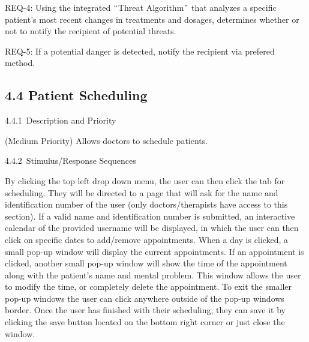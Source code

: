 \documentclass[12pt]{article}
\renewcommand{\_}{\kern-1.5pt\textunderscore\kern-1.5pt}
\begin{document}
\begin{adjustwidth}{0.5in}{0.0in}
REQ-4: Using the integrated $``$Threat Algorithm$"$  that analyzes a specific patient’s most recent changes in treatments and dosages, determines whether or not to notify the recipient of potential threats.\par

\end{adjustwidth}

\begin{adjustwidth}{0.5in}{0.0in}
REQ-5: If a potential danger is detected, notify the recipient via prefered method.\par

\end{adjustwidth}

\setlength{\parskip}{3.96pt}
\subsection*{4.4 \hspace*{10pt}Patient Scheduling}
\setlength{\parskip}{12.0pt}
4.4.1\  \tab Description and Priority\par

(Medium Priority) Allows doctors to schedule patients.\par

4.4.2\  \tab Stimulus/Response Sequences\par

By clicking the top left drop down menu, the user can then click the tab for scheduling. They will be directed to a page that will ask for the name and identification number of the user (only doctors/therapists have access to this section). If a valid name and identification number is submitted, an interactive calendar of the provided username will be displayed, in which the user can then click on specific dates to add/remove appointments. When a day is clicked, a small pop-up window will display the current appointments. If an appointment is clicked, another small pop-up window will show the time of the appointment along with the patient's name and mental problem. This window allows the user to modify the time, or completely delete the appointment. To exit the smaller pop-up windows the user can click anywhere outside of the pop-up windows border. Once the user has finished with their scheduling, they can save it by clicking the save button located on the bottom right corner or just close the window.\par
\end{document}
